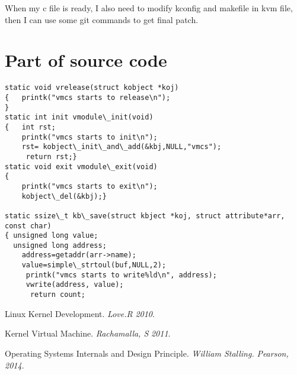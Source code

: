 \documentclass[10pt,draftclsnofoot,peerreview,letterpaper,onecolumn,]{IEEEtran}
\begin{document}
When my c file is ready, I also need to modify kconfig and makefile in kvm file, then I can use some git commands to get final patch. 

\section{Part of source code}

\begin{verbatim}
static void vrelease(struct kobject *koj)
{   printk("vmcs starts to release\n");
}
static int init vmodule\_init(void)
{   int rst;
    printk("vmcs starts to init\n");
    rst= kobject\_init\_and\_add(&kbj,NULL,"vmcs");
     return rst;}
static void exit vmodule\_exit(void)
{
    printk("vmcs starts to exit\n");
    kobject\_del(&kbj);}

static ssize\_t kb\_save(struct kbject *koj, struct attribute*arr, const char)
{ unsigned long value;
  unsigned long address;
    address=getaddr(arr->name);
    value=simple\_strtoul(buf,NULL,2);
     printk("vmcs starts to write%ld\n", address);
     vwrite(address, value);
      return count;
\end{verbatim}

\begin{thebibliography}{1}

 Linux Kernel Development.
\textit{Love.R}
\textit{2010}.

Kernel Virtual Machine.
\textit{Rachamalla, S}
\textit{2011}.



 Operating Systems Internals and Design Principle.
\textit{William Stalling.}
\textit{Pearson, 2014}.



\end{thebibliography}
\end{document}
